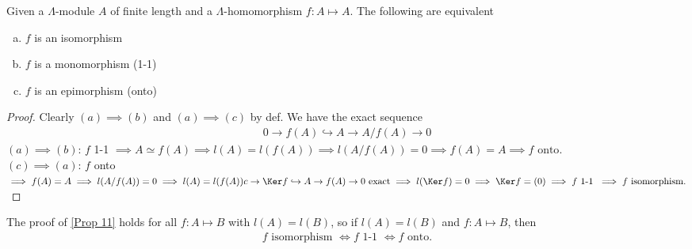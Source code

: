 \begin{prop}
\label{Prop 11}
Given a \(\Lambda\)-module \(A\) of finite length and a \(\Lambda\)-homomorphism \(f:A\mapsto A\). The following are equivalent
\begin{enumerate}[(a)]
    \item \(f\) is an isomorphism
    \item \(f\) is a monomorphism (1-1)
    \item \(f\) is an epimorphism (onto)
\end{enumerate}
\end{prop}
\begin{proof}
Clearly \((a)\implies (b)\) and \((a)\implies (c)\) by def. We have the exact sequence
\begin{align*}
    0\rightarrow f(A) \hookrightarrow A \rightarrow A/f(A) \rightarrow 0
\end{align*}
\noindent\underline{\((a)\implies (b)\)}: \(f\) 1-1 \(\implies A \simeq f(A) \implies l(A) = l(f(A))
\implies l(A/f(A)) = 0 \implies f(A) = A \implies f \text{  onto}.\)\\[0.3cm]
\noindent\underline{\((c) \implies (a)\)}: \(f\) onto \(\implies f(A) = A \implies l(A/f(A)) = 0 \implies l(A) = l(f(A))\\
c\rightarrow \Ker f \hookrightarrow A \rightarrow f(A) \rightarrow 0 \text{  exact} \implies l(\Ker f) = 0 \implies \Ker f = (0) \implies f \text{ 1-1 } \implies f \text{ isomorphism}.\)
\end{proof}
\begin{rem}
The proof of \ref{Prop 11} holds for all \(f:A\mapsto B\) with \(l(A) = l(B)\), so if \(l(A) = l(B)\) and \(f:A\mapsto B\), then 
\begin{align*}
    f \text{ isomorphism } \Leftrightarrow f \text{ 1-1 } \Leftrightarrow f \text{  onto}.
\end{align*}
\end{rem}

